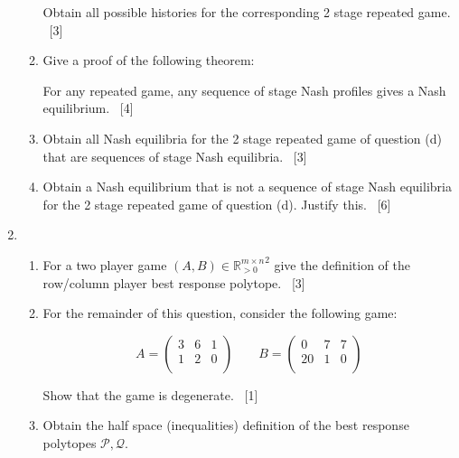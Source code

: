 \documentclass[12pt,a4paper]{article}
\begin{document}
\begin{enumerate}
\begin{enumerate}
            Obtain all possible histories for the corresponding 2 stage repeated
            game.
            ~\hfill{[3]}


        \item Give a proof of the following theorem:

            For any repeated game, any sequence of stage Nash profiles gives a
            Nash equilibrium.
            ~\hfill{[4]}

        \item Obtain all Nash equilibria for the 2 stage repeated game of
            question (d)
            that are sequences
            of stage Nash equilibria.
            ~\hfill{[3]}

        \item Obtain a Nash equilibrium that is not a sequence of stage Nash
            equilibria for the 2 stage repeated game of question (d). Justify
            this.
            ~\hfill{[6]}


    \end{enumerate}

\newpage
\item

    \begin{enumerate}
        \item For a two player game $(A, B)\in{\mathbb{R}^{m\times n}_{>0}}^2$
            give the definition of the row/column player best response polytope.
            ~\hfill{[3]}
        \item For the remainder of this question, consider the following 
            game:

            \[
                A = \begin{pmatrix}
                    3 & 6 & 1\\
                    1 & 2 & 0\\
                    \end{pmatrix}
                \qquad
                B = \begin{pmatrix}
                    0 & 7 & 7\\
                   20 & 1 & 0\\
                    \end{pmatrix}
            \]

        Show that the game is degenerate.
            ~\hfill{[1]}

        \item Obtain the half space (inequalities) definition of the best
            response polytopes \(\mathcal{P},\mathcal{Q}\).


\end{enumerate}
\end{enumerate}
\end{document}
